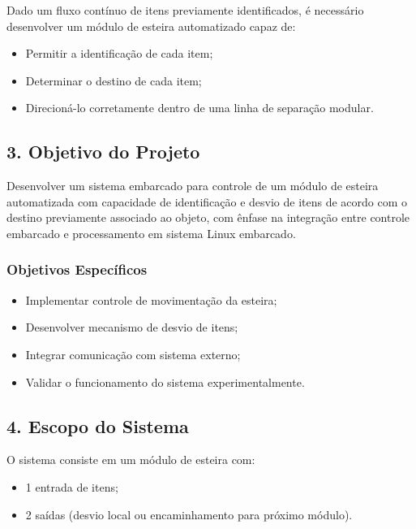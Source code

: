 Dado um fluxo contínuo de itens previamente identificados, é necessário
desenvolver um módulo de esteira automatizado capaz de:

\begin{itemize}
    \item Permitir a identificação de cada item;
    \item Determinar o destino de cada item;
    \item Direcioná-lo corretamente dentro de uma linha de separação modular.
\end{itemize}

\subsection*{3. Objetivo do Projeto}

Desenvolver um sistema embarcado para controle de um módulo de esteira
automatizada com capacidade de identificação e desvio de itens de acordo com o
destino previamente associado ao objeto, com ênfase na integração entre
controle embarcado e processamento em sistema Linux embarcado.

\subsubsection*{Objetivos Específicos}

\begin{itemize}
    \item Implementar controle de movimentação da esteira;
    \item Desenvolver mecanismo de desvio de itens;
    \item Integrar comunicação com sistema externo;
    \item Validar o funcionamento do sistema experimentalmente.
\end{itemize}

\subsection*{4. Escopo do Sistema}

O sistema consiste em um módulo de esteira com:

\begin{itemize}
    \item 1 entrada de itens;
    \item 2 saídas (desvio local ou encaminhamento para próximo módulo).
\end{itemize}

